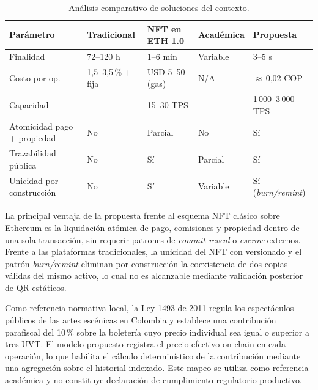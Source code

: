 \begin{table}[H]
\centering
\small
\caption{Análisis comparativo de soluciones del contexto.}
\label{tab:analisis-contexto}
\begin{tabular}{p{3.2cm}p{2.7cm}p{2.7cm}p{2.7cm}p{2.7cm}}
\toprule
\textbf{Parámetro} & \textbf{Tradicional} & \textbf{NFT en ETH 1.0} & \textbf{Académica} & \textbf{Propuesta} \\
\midrule
Finalidad & 72--120 h & 1--6 min & Variable & 3--5 s \\
Costo por op. & 1{,}5--3{,}5\,\% + fija & USD 5--50 (gas) & N/A & $\approx$\,0{,}02 COP \\
Capacidad & --- & 15--30 TPS & --- & 1\,000--3\,000 TPS \\
Atomicidad pago + propiedad & No & Parcial & No & Sí \\
Trazabilidad pública & No & Sí & Parcial & Sí \\
Unicidad por construcción & No & Sí & Variable & Sí (\textit{burn/remint}) \\
\bottomrule
\end{tabular}
\end{table}

La principal ventaja de la propuesta frente al esquema NFT clásico sobre Ethereum es la liquidación atómica de pago, comisiones y propiedad dentro de una sola transacción, sin requerir patrones de \textit{commit-reveal} o \textit{escrow} externos. Frente a las plataformas tradicionales, la unicidad del NFT con versionado y el patrón \textit{burn/remint} eliminan por construcción la coexistencia de dos copias válidas del mismo activo, lo cual no es alcanzable mediante validación posterior de QR estáticos.

Como referencia normativa local, la Ley 1493 de 2011 regula los espectáculos públicos de las artes escénicas en Colombia y establece una contribución parafiscal del 10\,\% sobre la boletería cuyo precio individual sea igual o superior a tres UVT. El modelo propuesto registra el precio efectivo on-chain en cada operación, lo que habilita el cálculo determinístico de la contribución mediante una agregación sobre el historial indexado. Este mapeo se utiliza como referencia académica y no constituye declaración de cumplimiento regulatorio productivo.
